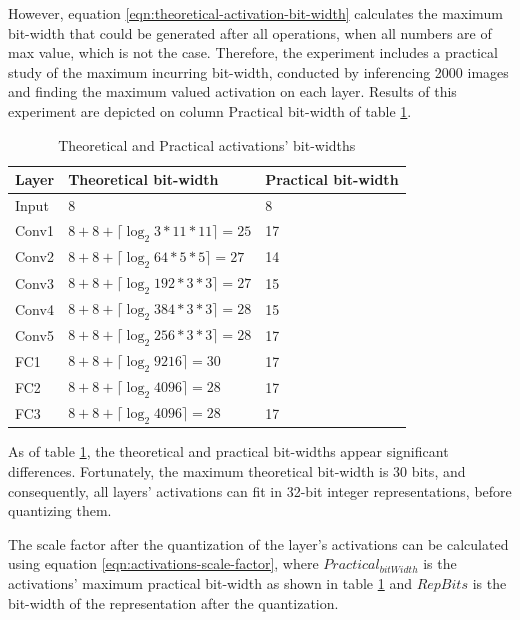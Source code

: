 However, equation \ref{eqn:theoretical-activation-bit-width} calculates the maximum bit-width that could be generated after all operations, when all numbers are of max value, which is not the case. Therefore, the experiment includes a practical study of the maximum incurring bit-width, conducted by inferencing 2000 images and finding the maximum valued activation on each layer. Results of this experiment are depicted on column Practical bit-width of table \ref{tab:Theoretical-and-Practical-activations-bit-widths}.

\begin{table}[H]
	\caption{Theoretical and Practical activations' bit-widths}
	\label{tab:Theoretical-and-Practical-activations-bit-widths}
	\centering
	\begin{tabular}{lll}
		\toprule
		\textbf{Layer} & \textbf{Theoretical bit-width} & \textbf{Practical bit-width}\\
		\midrule
			Input & 8 & 8\\
			Conv1 & $ 8 + 8 + \lceil \log_2 3 * 11 * 11 \rceil = 25 $ & 17\\
			Conv2 & $ 8 + 8 + \lceil \log_2 64 * 5 * 5 \rceil = 27$ & 14\\
			Conv3 & $ 8 + 8 + \lceil \log_2 192 * 3 * 3 \rceil = 27$ & 15\\
			Conv4 & $ 8 + 8 + \lceil \log_2 384 * 3 * 3 \rceil = 28$ & 15\\
			Conv5 & $ 8 + 8 + \lceil \log_2 256 * 3 * 3 \rceil = 28$ & 17\\
			FC1 & $ 8 + 8 + \lceil \log_2 9216 \rceil = 30$ & 17\\
			FC2 & $ 8 + 8 + \lceil \log_2 4096 \rceil = 28$ & 17\\
			FC3 & $ 8 + 8 + \lceil \log_2 4096 \rceil = 28$ & 17\\
		\bottomrule
	\end{tabular}
\end{table}

As of table \ref{tab:Theoretical-and-Practical-activations-bit-widths}, the theoretical and practical bit-widths appear significant differences. Fortunately, the maximum theoretical bit-width is 30 bits, and consequently, all layers' activations can fit in 32-bit integer representations, before quantizing them.

The scale factor after the quantization of the layer's activations can be calculated using equation \ref{eqn:activations-scale-factor}, where $Practical_{bitWidth}$ is the activations' maximum practical bit-width as shown in table \ref{tab:Theoretical-and-Practical-activations-bit-widths} and $RepBits$ is the bit-width of the representation after the quantization.

